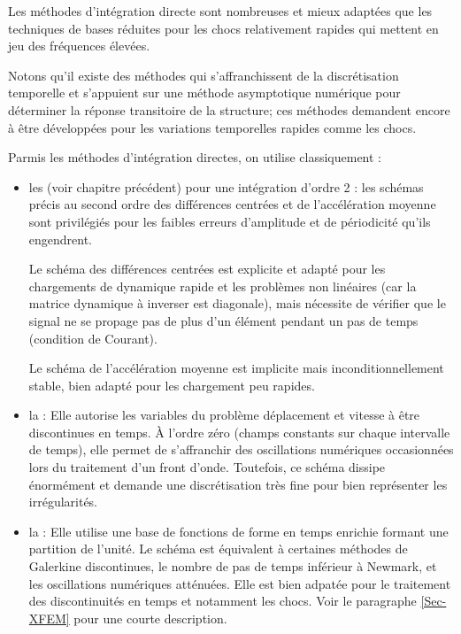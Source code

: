 Les méthodes d'intégration directe sont nombreuses et mieux adaptées que les
techniques de bases réduites pour les chocs relativement rapides qui mettent en jeu des 
fréquences élevées.

Notons qu'il existe des méthodes qui s'affranchissent de la discrétisation temporelle et
s'appuient sur une méthode asymptotique numérique pour déterminer la réponse
transitoire de la structure; ces méthodes demandent encore à être
développées pour les variations temporelles rapides comme les chocs.

Parmis les méthodes d'intégration directes, on utilise classiquement :
\begin{itemize}
	\item les  (voir chapitre précédent) pour une intégration d'ordre 2 :
		les schémas précis au second ordre des différences centrées et de 
		l'accélération moyenne sont privilégiés pour les faibles erreurs d'amplitude
		et de périodicité qu'ils engendrent.
		
		Le schéma des différences centrées
		est explicite et adapté pour les chargements de dynamique rapide et les
		problèmes non linéaires (car la matrice dynamique à inverser est diagonale),
		mais nécessite de vérifier que le signal ne se propage pas de plus d'un élément
		pendant un pas de temps (condition de Courant).
		
		Le schéma de l'accélération moyenne est implicite mais inconditionnellement
		stable, bien adapté pour les chargement peu rapides.
	\item la :
		Elle autorise les variables du problème déplacement et vitesse à être
		discontinues en temps.
		À l'ordre zéro (champs constants sur chaque intervalle de temps), elle permet
		de s'affranchir des oscillations numériques occasionnées lors du traitement
		d'un front d'onde.
		Toutefois, ce schéma dissipe énormément et demande une discrétisation
		très fine pour bien représenter les irrégularités.
	\item la :
		Elle utilise une base de fonctions de forme en temps enrichie formant une partition de l'unité.
		Le schéma est équivalent à certaines méthodes de Galerkine discontinues, le nombre de
		pas de temps inférieur à Newmark, et les oscillations numériques atténuées.
		Elle est bien adpatée pour le traitement des discontinuités en temps et
		notamment les chocs. Voir le paragraphe \ref{Sec-XFEM} pour une courte description.
\end{itemize}

